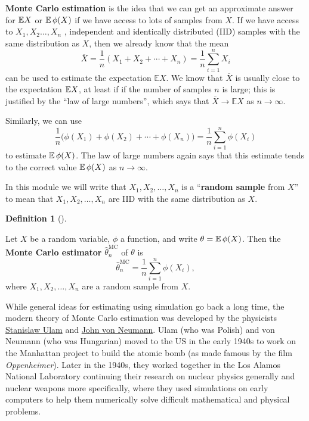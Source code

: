 \documentclass[
  letterpaper,
  DIV=11,
  numbers=noendperiod]{scrreprt}
\theoremstyle{plain}
\theoremstyle{definition}
\newtheorem{definition}{Definition}[chapter]
\theoremstyle{definition}
\theoremstyle{remark}
\begin{document}
\textbf{Monte Carlo estimation} is the idea that we can get an
approximate answer for \(\mathbb{E} X\) or \(\operatorname{\mathbb{E}} \phi(X)\) if we have access
to lots of samples from \(X\). If we have access to
\(X_1, X_2 \dots, X_n\) , independent and identically distributed (IID)
samples with the same distribution as \(X\), then we already know that
the mean
\[ \overline X = \frac{1}{n}(X_1 + X_2 + \cdots + X_n) = \frac{1}{n} \sum_{i=1}^n X_i \]
can be used to estimate the expectation \(\mathbb EX\). We know that
\(\overline X\) is usually close to the expectation \(\mathbb{E} X\), at least
if if the number of samples \(n\) is large; this is justified by the
``law of large numbers'', which says that \(\overline X \to \mathbb EX\)
as \(n \to \infty\).

Similarly, we can use
\[ \frac{1}{n} \big(\phi(X_1) + \phi(X_2) + \cdots + \phi(X_n) \big) = \frac{1}{n} \sum_{i=1}^n \phi(X_i) \]
to estimate \(\operatorname{\mathbb{E}} \phi(X)\). The law of large numbers again says that
this estimate tends to the correct value \(\operatorname{\mathbb{E}} \phi(X)\) as
\(n \to \infty\).

In this module we will write that \(X_1, X_2, \dots, X_n\) is a
``\textbf{random sample} from \(X\)'' to mean that
\(X_1, X_2, \dots, X_n\) are IID with the same distribution as \(X\).

\begin{definition}[]\protect\hypertarget{def-MCest}{}\label{def-MCest}

Let \(X\) be a random variable, \(\phi\) a function, and write
\(\theta = \operatorname{\mathbb{E}}\phi(X)\). Then the \textbf{Monte Carlo estimator}
\(\widehat\theta_n^{\mathrm{MC}}\) of \(\theta\) is
\[ \widehat{\theta}_n^{\mathrm{MC}} = \frac{1}{n} \sum_{i=1}^n \phi(X_i) , \]
where \(X_1, X_2, \dots, X_n\) are a random sample from \(X\).

\end{definition}

While general ideas for estimating using simulation go back a long time,
the modern theory of Monte Carlo estimation was developed by the
physicists \href{https://en.wikipedia.org/wiki/Stanisław_Ulam}{Stanislaw
Ulam} and \href{https://en.wikipedia.org/wiki/John_von_Neumann}{John von
Neumann}. Ulam (who was Polish) and von Neumann (who was Hungarian)
moved to the US in the early 1940s to work on the Manhattan project to
build the atomic bomb (as made famous by the film \emph{Oppenheimer}).
Later in the 1940s, they worked together in the Los Alamos National
Laboratory continuing their research on nuclear physics generally and
nuclear weapons more specifically, where they used simulations on early
computers to help them numerically solve difficult mathematical and
physical problems.
\end{document}
